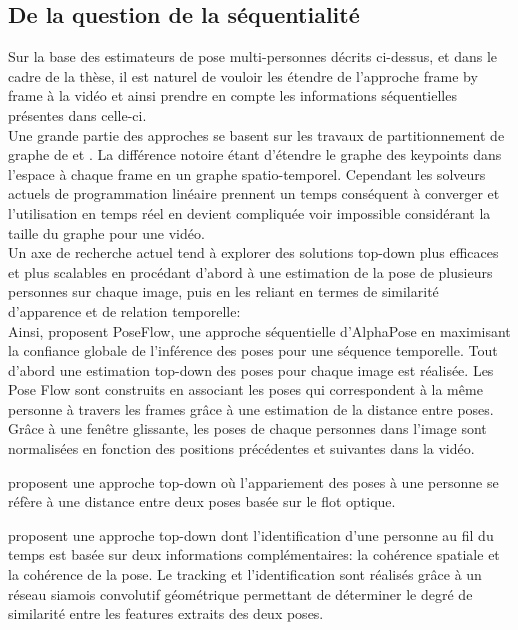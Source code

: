 \subsection{De la question de la séquentialité}
Sur la base des estimateurs de pose multi-personnes décrits ci-dessus, et dans le cadre de la thèse, il est naturel de vouloir les étendre de l'approche frame by frame à la vidéo et ainsi prendre en compte les informations séquentielles présentes dans celle-ci.\\

Une grande partie des approches se basent sur les travaux de partitionnement de graphe de \cite{2015arXiv151106645P} et \cite{2016arXiv160503170I}. La différence notoire étant d'étendre le graphe des keypoints dans l'espace à chaque frame en un graphe spatio-temporel. Cependant les solveurs actuels de programmation linéaire prennent un temps conséquent à converger et l'utilisation en temps réel en devient compliquée voir impossible considérant la taille du graphe pour une vidéo.\\

Un axe de recherche actuel tend à explorer des solutions top-down plus efficaces et plus scalables en procédant d'abord à une estimation de la pose de plusieurs personnes sur chaque image, puis en les reliant
en termes de similarité d'apparence et de relation temporelle:\\

Ainsi, \cite{2018arXiv180200977X} proposent PoseFlow, une approche séquentielle d'AlphaPose \cite{fang2017rmpe} en maximisant la confiance globale de l'inférence des poses pour une séquence temporelle. Tout d'abord une estimation top-down des poses pour chaque image est réalisée. Les Pose Flow sont construits en associant les poses qui correspondent à la même personne à travers les frames grâce à une estimation de la distance entre poses. Grâce à une fenêtre glissante, les poses de chaque personnes dans l'image sont normalisées en fonction des positions précédentes et suivantes dans la vidéo.

\cite{2019arXiv190502822N} proposent une approche top-down où l'appariement des poses à une personne se réfère à une distance entre deux poses basée sur le flot optique.

\cite{2018arXiv180406208X} proposent une approche top-down dont l'identification d'une personne au fil du temps est basée sur deux informations complémentaires: la cohérence spatiale et la cohérence de la pose. Le tracking et l'identification sont réalisés grâce à un réseau siamois convolutif géométrique permettant de déterminer le degré de similarité entre les features extraits des deux poses.
 
